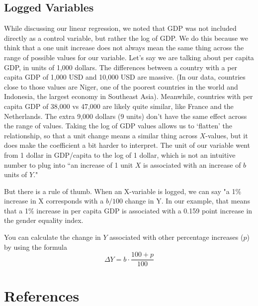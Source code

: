 \documentclass{book}
\begin{document}
\hypertarget{logged-variables}{%
\section{Logged Variables}\label{logged-variables}}

While discussing our linear regression, we noted that GDP was not included
directly as a control variable, but rather the log of GDP. We do this because
we think that a one unit increase does not always mean the same thing across
the range of possible values for our variable. Let's say we are talking about
per capita GDP, in units of 1,000 dollars. The differences between a country
with a per capita GDP of 1,000 USD and 10,000 USD are massive. (In our data,
countries close to those values are Niger, one of the poorest countries in the
world and Indonesia, the largest economy in Southeast Asia). Meanwhile,
countries with per capita GDP of 38,000 vs 47,000 are likely quite similar,
like France and the Netherlands. The extra 9,000 dollars (9 units) don't have
the same effect across the range of values. Taking the log of GDP values
allows us to `flatten' the relationship, so that a unit change means a similar
thing across \(X\)-values, but it does make the coefficient a bit harder to
interpret. The unit of our variable went from 1 dollar in GDP/capita to the
log of 1 dollar, which is not an intuitive number to plug into ``an increase
of 1 unit \(X\) is associated with an increase of \(b\) units of \(Y\)."

But there is a rule of thumb. When an X-variable is logged, we can say "a 1\%
increase in X corresponds with a \(b/100\) change in Y. In our example, that
means that a 1\% increase in per capita GDP is associated with a 0.159 point
increase in the gender equality index.

You can calculate the change in \(Y\) associated with other percentage
increases (\(p\)) by using the formula
\[\Delta Y = b \cdot \frac{100+p}{100}\]

\hypertarget{bibliography}{%
\chapter*{References}\label{bibliography}}
\end{document}
